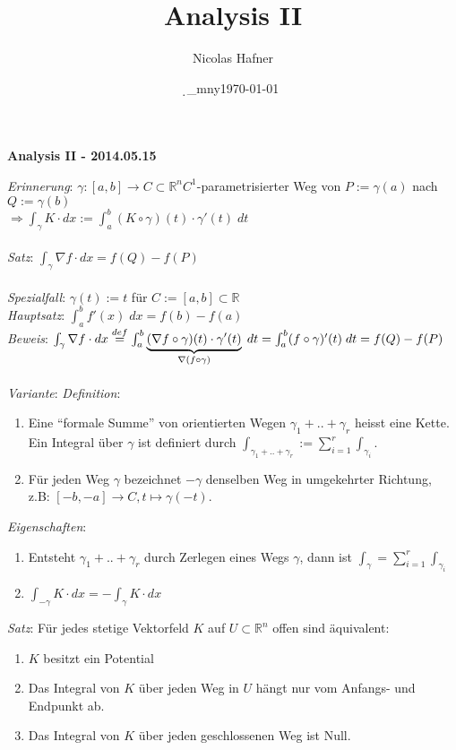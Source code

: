 \documentclass[12pt,a4paper,titlepage]{article}
\author{Nicolas Hafner}
\title{Analysis II}
\date{\d_mny\today}
\newcommand{\setR}{\mathbb{R}}
\begin{document}
	
\begin{center}{\bfseries\Huge Analysis II - 2014.05.15}\end{center}
\textit{Erinnerung}: $\gamma:[a,b]\to C\subset\setR^n$\quad $C^1$-parametrisierter Weg von $P:=\gamma(a)$ nach $Q:=\gamma(b)$ \\
$\Rightarrow \int_\gamma K\cdot dx :=\int_a^b(K\circ\gamma)(t)\cdot\gamma'(t)\;dt$ \\
\\
\textit{Satz}: $\int_\gamma\nabla f\cdot dx=f(Q)-f(P)$ \\
\\
\textit{Spezialfall}: $\gamma(t):=t$ für $C:=[a,b]\subset\setR$ \\
\textit{Hauptsatz}: $\int_a^bf'(x) \;dx=f(b)-f(a)$ \\
\textit{Beweis}: $\int_\gamma\nabla f\cdot dx\overset{def}{=}\int_a^b\underbrace{(\nabla f\circ\gamma)(t)\cdot\gamma'(t)}_{\mathclap{\nabla(f\circ\gamma)}} \;dt = \int_a^b(f\circ\gamma)'(t) \;dt = f(Q)-f(P)$ \\
\\
\textit{Variante}: \textit{Definition}: \begin{enumerate}[label=\alph*)]
\item Eine ``formale Summe'' von orientierten Wegen $\gamma_1+..+\gamma_r$ heisst eine Kette. Ein Integral über $\gamma$ ist definiert durch $\int_{\gamma_1+..+\gamma_r}:=\sum\limits_{i=1}^r\int_{\gamma_i}$.
\item Für jeden Weg $\gamma$ bezeichnet $-\gamma$ denselben Weg in umgekehrter Richtung, \\
  z.B: $ [-b,-a]\to C,t\mapsto \gamma(-t)$.
\end{enumerate}
\textit{Eigenschaften}: \begin{enumerate}[label=\alph*)]
\item Entsteht $\gamma_1+..+\gamma_r$ durch Zerlegen eines Wegs $\gamma$, dann ist $\int_\gamma=\sum\limits_{i=1}^r\int_{\gamma_i}$
\item $\int_{-\gamma}K\cdot dx=-\int_\gamma K\cdot dx$
\end{enumerate}
\textit{Satz}: Für jedes stetige Vektorfeld $K$ auf $U\subset\setR^n$ offen sind äquivalent: \begin{enumerate}[label=\alph*)]
\item $K$ besitzt ein Potential
\item Das Integral von $K$ über jeden Weg in $U$ hängt nur vom Anfangs- und Endpunkt ab.
\item Das Integral von $K$ über jeden geschlossenen Weg ist Null.
\end{enumerate}
\end{document}
